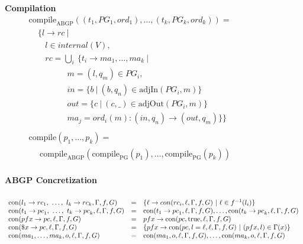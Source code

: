\documentclass[twocolumn, openany]{sig-alternate-10pt}
\newcommand{\hdr}[2]{\flushleft \chdr{\hspace{5mm}#1}{#2}}
\newcommand{\chdr}[2]{\textbf{#1} {#2} \\ \centering}%
\begin{document}
\begin{figure}[h!]
\begin{minipage}[t]{.46\linewidth}
  \end{minipage}
  \begin{minipage}[t]{.5\linewidth}
  \hdr{Compilation}{}
  \vspace*{-1\baselineskip}
  \[ \begin{array}{l}
     \text{compile}_\text{ABGP}( (t_1,PG_1,ord_1), \dots, (t_k,PG_k,ord_k) ) = \\
     ~~~~~ \{ l \rightarrow rc ~\vert~ \\
     ~~~~~~~~~ l \in internal(V), \\
     ~~~~~~~~~ rc = \bigcup_i~ \{ t_i \rightarrow ma_1, \dots, ma_k ~\vert~ \\
     ~~~~~~~~~~~~~~~~~~~~~ m = (l,q_m) \in PG_i, \\
     ~~~~~~~~~~~~~~~~~~~~~ in = \{ b ~\vert~ (b,q_n) \in \text{adjIn}(PG_i,m) \} \\
     ~~~~~~~~~~~~~~~~~~~~~ out = \{ c ~\vert~ (c,\_) \in \text{adjOut}(PG_i,m) \} \\
     ~~~~~~~~~~~~~~~~~~~~~ ma_j = ord_i(m) : (in,q_n) \rightarrow (out,q_m) \} \} \\
     \\
     \text{compile}( p_1, \dots, p_k ) = \\
     ~~~~~~ \text{compile}_\text{ABGP}(\text{compile}_\text{PG}(p_1), \dots, \text{compile}_\text{PG}(p_k)) \\
  \end{array} \]%
  \end{minipage}

  \vspace{1em}
  \vspace{1em}

  \begin{minipage}[t]{\linewidth}
  \hdr{ABGP Concretization}{}
  \vspace*{-2\baselineskip}
  \[ \begin{array}{lcl}
     \\
     \text{con}(l_1 \rightarrow {rc}_1, ~\dots,~ l_k \rightarrow {rc}_k,\Gamma,f,G) 
        & = & 
        \{ \ell \rightarrow con(rc_i,\ell,\Gamma,f,G)  ~\vert~ \ell \in f^{-1}(l_i) \}
        \\
     \text{con}(t_1 \rightarrow {pc}_1, ~\dots,~ t_k \rightarrow {pc}_k,\ell,\Gamma,f,G) 
        & = &  
        \text{con}(t_1 \rightarrow {pc}_1,\ell,\Gamma,f,G), \dots, \text{con}(t_k \rightarrow {pc}_k,\ell,\Gamma,f,G)
        \\
     \text{con}(pfx \rightarrow {pc},\ell,\Gamma,f,G) 
        & = &  
        pfx \rightarrow \text{con}(pc,\text{true},\ell,\Gamma,f,G)
        \\
     \text{con}(\$x \rightarrow {pc},\ell,\Gamma,f,G) 
        & = &  
        \{ pfx \rightarrow \text{con}(pc, l=\ell, \ell,\Gamma,f,G) ~\vert~ (pfx, l) \in \Gamma(x) \}
        \\
     \text{con}(ma_1, \dots, ma_k,o,\ell,\Gamma,f,G) 
        & = &
        \text{con}(ma_1,o,\ell,\Gamma,f,G), \dots, \text{con}(ma_k,o,\ell,\Gamma,f,G)
        \\


\end{array}\]
\end{minipage}
\end{figure}
\end{document}
